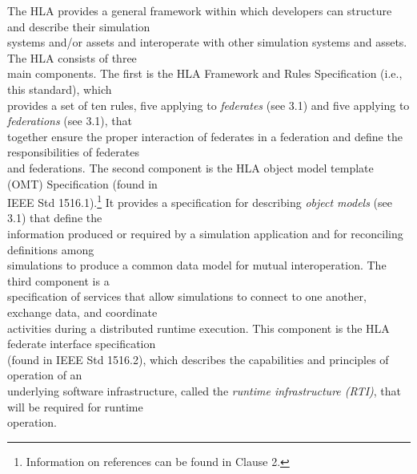 \vspace{1.1pt}
The HLA provides a general framework within which developers can structure and describe their simulation\\
systems and/or assets and interoperate with other simulation systems and assets. The HLA consists of three\\
main components. The first is the HLA Framework and Rules Specification (i.e., this standard), which\\
provides a set of ten rules, five applying to \textit{federates} (see 3.1) and five applying to \textit{federations} (see 3.1), that\\
together ensure the proper interaction of federates in a federation and define the responsibilities of federates\\
and federations. The second component is the HLA object model template (OMT) Specification (found in\\
IEEE Std 1516.1).\footnote{Information on references can be found in Clause 2.} It provides a specification for describing \textit{object models} (see 3.1) that define the\\
information produced or required by a simulation application and for reconciling definitions among\\
simulations to produce a common data model for mutual interoperation. The third component is a\\
specification of services that allow simulations to connect to one another, exchange data, and coordinate\\
activities during a distributed runtime execution. This component is the HLA federate interface specification\\
(found in IEEE Std 1516.2), which describes the capabilities and principles of operation of an\\
underlying software infrastructure, called the \textit{runtime infrastructure (RTI)}, that will be required for runtime\\
operation.

